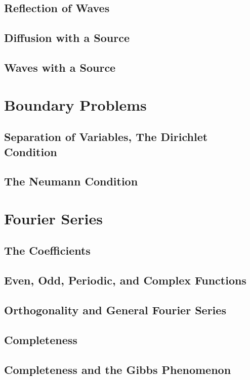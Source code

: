 \documentclass[11pt,letterpaper]{article}
\begin{document}
\subsection{Reflection of Waves}
\subsection{Diffusion with a Source}
\subsection{Waves with a Source}
\section{Boundary Problems}
\subsection{Separation of Variables, The Dirichlet Condition}
\subsection{The Neumann Condition}
\section{Fourier Series}
\subsection{The Coefficients}
\subsection{Even, Odd, Periodic, and Complex Functions}
\subsection{Orthogonality and General Fourier Series}
\subsection{Completeness}
\subsection{Completeness and the Gibbs Phenomenon}
\end{document}
